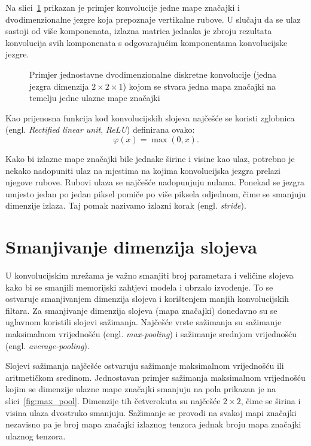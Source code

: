 \documentclass[utf8, diplomski, numeric, lmodern]{fer}
\newcommand{\ilustracija}[1]{}
\begin{document}
Na slici~\ref{fig:konv} prikazan je primjer konvolucije jedne mape značajki i dvodimenzionalne jezgre koja prepoznaje vertikalne rubove. U slučaju da se ulaz sastoji od više komponenata, izlazna matrica jednaka je zbroju rezultata konvolucija svih komponenata s odgovarajućim komponentama konvolucijske jezgre.

\begin{figure}[htbp] \centering
	\ilustracija{konv}
	\caption{Primjer jednostavne dvodimenzionalne diskretne konvolucije (jedna jezgra dimenzija $2\times 2\times 1$) kojom se stvara jedna mapa značajki na temelju jedne ulazne mape značajki}
	\label{fig:konv}
\end{figure}

Kao prijenosna funkcija kod konvolucijskih slojeva najčešće se koristi zglobnica (engl. \emph{Rectified linear unit}, \emph{ReLU}) definirana ovako:
\begin{equation}
\varphi(x) = \max(0, x).
\end{equation}

Kako bi izlazne mape značajki bile jednake širine i visine kao ulaz, potrebno je nekako nadopuniti ulaz na mjestima na kojima konvolucijska jezgra prelazi njegove rubove. Rubovi ulaza se najčešće nadopunjuju nulama. Ponekad se jezgra umjesto jedan po jedan piksel pomiče po više piksela odjednom, čime se smanjuju dimenzije izlaza. Taj pomak nazivamo izlazni korak (engl. \emph{stride}).


\section{Smanjivanje dimenzija slojeva} \label{sec:smanjivanje-dimenzija}

U konvolucijskim mrežama je važno smanjiti broj parametara i veličine slojeva kako bi se smanjili memorijski zahtjevi modela i ubrzalo izvođenje. To se ostvaruje smanjivanjem dimenzija slojeva i korištenjem manjih konvolucijskih filtara. Za smanjivanje dimenzija slojeva (mapa značajki) donedavno su se uglavnom koristili slojevi sažimanja. Najčešće vrste sažimanja su sažimanje maksimalnom vrijednošću (engl. \emph{max-pooling}) i sažimanje srednjom vrijednošću (engl. \emph{average-pooling}). 

Slojevi sažimanja najčešće ostvaruju sažimanje maksimalnom vrijednošću ili aritmetičkom sredinom. Jednostavan primjer sažimanja maksimalnom vrijednošću kojim se dimenzije ulazne mape značajki smanjuju na pola prikazan je na slici~\ref{fig:max_pool}. Dimenzije tih četverokuta su najčešće $2\times2$, čime se širina i visina ulaza dvostruko smanjuju. Sažimanje se provodi na svakoj mapi značajki nezavisno pa je broj mapa značajki izlaznog tenzora jednak broju mapa značajki ulaznog tenzora.
\end{document}
